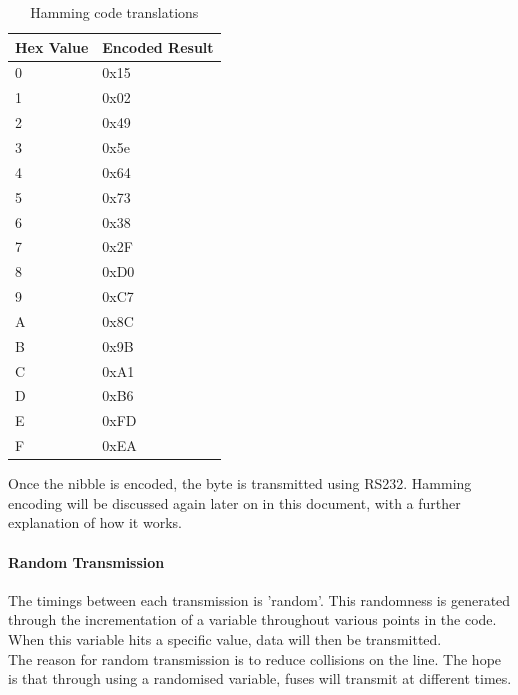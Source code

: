 \documentclass[preprint,12pt,3p]{elsarticle}
\begin{document}
\begin{table}[H]
\centering
\resizebox{4cm}{!} {%
    \centering
    \begin{tabular}{| l | l |}
    \hline
    Hex Value & Encoded Result  \\ \hline
    0 & 0x15 \\ \hline
    1 & 0x02 \\ \hline
    2 & 0x49 \\ \hline
    3 & 0x5e \\ \hline
    4 & 0x64 \\ \hline
    5 & 0x73 \\ \hline
    6 & 0x38 \\ \hline
    7 & 0x2F \\ \hline
    8 & 0xD0 \\ \hline
    9 & 0xC7 \\ \hline
    A & 0x8C \\ \hline
    B & 0x9B \\ \hline
    C & 0xA1 \\ \hline
    D & 0xB6 \\ \hline
    E & 0xFD \\ \hline
    F & 0xEA \\ \hline
    \end{tabular}
}
\caption{Hamming code translations}
\end{table}
Once the nibble is encoded, the byte is transmitted using RS232. Hamming encoding will be discussed again later on in this document, with a further explanation of how it works.

\paragraph{Random Transmission}
The timings between each transmission is 'random'. This randomness is generated through the incrementation of a variable throughout various points in the code. When this variable hits a specific value, data will then be transmitted. \\
The reason for random transmission is to reduce collisions on the line. The hope is that through using a randomised variable, fuses will transmit at different times.
\end{document}
